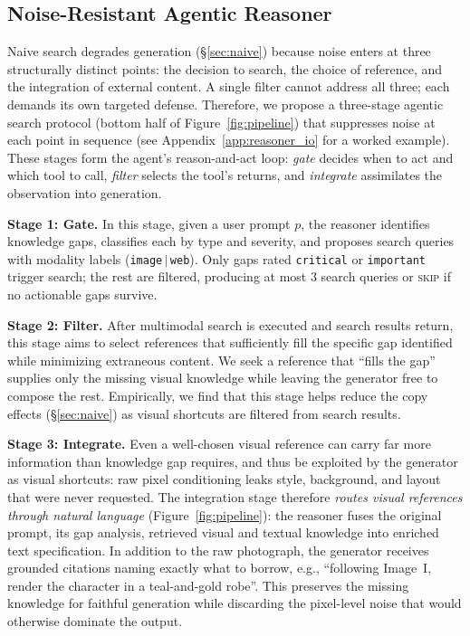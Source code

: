 \documentclass{article}
\begin{document}
\subsection{Noise-Resistant {Agentic} Reasoner}
\label{sec:atomic}

Naive search degrades generation (\S\ref{sec:naive}) because noise enters at three structurally distinct points: the decision to search, the choice of reference, and the integration of external content.
A single filter cannot address all three; each demands its own targeted defense.
Therefore, we propose a three-stage agentic search protocol (bottom half of Figure~\ref{fig:pipeline}) that suppresses noise at each point in sequence (see Appendix~\ref{app:reasoner_io} for a worked example). {These stages form the agent's reason-and-act loop: \emph{gate} decides when to act and which tool to call, \emph{filter} selects the tool's returns, and \emph{integrate} assimilates the observation into generation.}

\textbf{Stage 1: Gate.}
In this stage, given a user prompt $p$, the reasoner identifies knowledge gaps, classifies each by type and severity, and proposes search queries with modality labels (\texttt{image}\,$|$\,\texttt{web}).
Only gaps rated \texttt{critical} or \texttt{important} trigger search; the rest are filtered, producing at most 3 search queries or \textsc{skip} if no actionable gaps survive.

\textbf{Stage 2: Filter.}
After multimodal search is executed and search results return, this stage aims to select references that sufficiently fill the specific gap identified  while minimizing extraneous content. We seek a reference that ``fills the gap'' supplies only the missing visual knowledge while leaving the generator free to compose the rest. Empirically, we find that this stage helps reduce the copy effects (\S\ref{sec:naive}) as visual shortcuts are filtered from search results. 


\textbf{Stage 3: Integrate.}
Even a well-chosen visual reference can carry far more information than knowledge gap requires, and thus be exploited by the generator as visual shortcuts: raw pixel conditioning leaks style, background, and layout that were never requested. The integration stage therefore \emph{routes visual references through natural language} (Figure~\ref{fig:pipeline}): the reasoner fuses the original prompt, its gap analysis, retrieved visual and textual knowledge into enriched text specification. In addition to the raw photograph, the generator receives grounded citations naming exactly what to borrow, e.g., ``following Image~I, render the character in a teal-and-gold robe''. This preserves the missing knowledge for faithful generation while discarding the pixel-level noise that would otherwise dominate the output.
\end{document}
